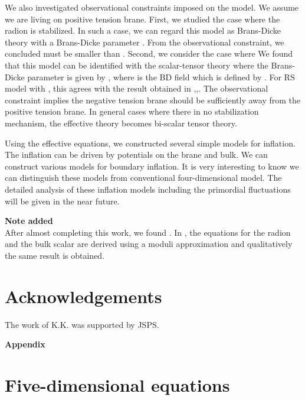 \documentclass[a4paper,11pt]{article}
\begin{document}
We also investigated observational constraints imposed on the model.
We assume we are living on positive tension brane.
First, we studied the case where 
the radion \coordHE{} is stabilized. In such a case, we can regard this model 
as Brans-Dicke theory with a Brans-Dicke parameter \coordHE{}. 
From the observational  constraint, we concluded \coordHE{} must be smaller than 
\coordHE{}. 
Second, we consider the case where \coordHE{} We found that this model 
can be identified with the scalar-tensor theory where the Brans-Dicke 
parameter is given by \coordHE{}, where \myHighlight{$\varphi$}\coordHE{}
is the BD field which is defined by \coordHE{}. For RS model with \coordHE{}, 
this agrees with the result obtained in 
\cite{Kanno1},\cite{Kanno2},\cite{GT}. 
The observational constraint implies the negative tension brane should be 
sufficiently away from the positive tension brane. In general cases
where there in no stabilization mechanism, the effective theory becomes 
bi-scalar tensor theory. 

Using the effective equations, we constructed several
simple models for inflation. The inflation can be driven by  
potentials on the brane and bulk. We can construct various 
models for boundary inflation. It is very interesting to know 
we can distinguish these models from conventional
four-dimensional model. The detailed analysis of these
inflation models including the primordial fluctuations 
will be given in the near future. 

{\bf Note added}\\
After almost completing this work, we found \cite{BBDR2}. In
\cite{BBDR2}, the equations for the radion and the bulk scalar 
are derived using a moduli approximation and qualitatively the 
same result is obtained.


\section*{Acknowledgements}
The work of K.K. was supported by JSPS.

\appendix
\begin{flushleft}
{\Large\bfseries Appendix}
\end{flushleft}

\section{Five-dimensional equations \label{APP1} }
\end{document}
